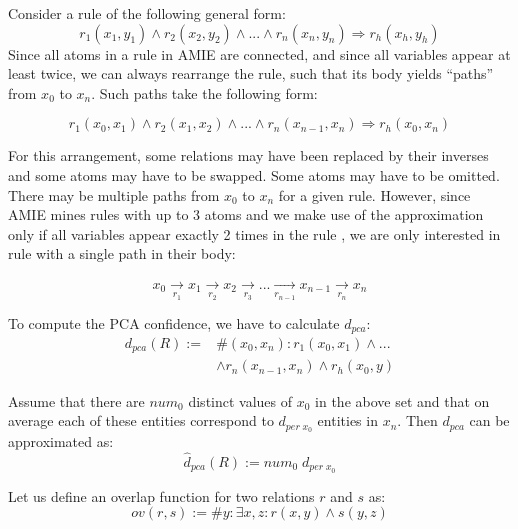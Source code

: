 {{Consider a rule of the following general form:
$$
  r_1(x_1,y_1) \wedge r_2(x_2,y_2) \wedge ... \wedge r_n(x_n,y_n) \Rightarrow r_h(x_h,y_h)
$$
Since all atoms in a rule in AMIE are connected, and since all variables appear at least twice, we can always rearrange the rule, such that its body yields  ``paths'' from $x_0$ to $x_n$. Such paths take the following form:

$$
  r_1(x_0,x_1) \wedge r_2(x_1,x_2) \wedge ... \wedge r_n(x_{n-1},x_n) \Rightarrow r_h(x_0,x_n)
$$


For this arrangement, some relations may have been replaced by their inverses and some atoms may have to be swapped. Some atoms may have to be omitted.
There may be multiple paths from $x_0$ to $x_n$ for a given rule.
However, since AMIE mines rules with up to 3 atoms and we make use of the approximation only if all variables appear exactly 2 times in the rule
,
we are only interested in rule with a single path in their body: 

\[
 x_0 \xrightarrow[r_1]{}x_1 \xrightarrow[r_2]{}     x_2 \xrightarrow[r_3]{}...  \xrightarrow[r_{n-1}]{}  x_{n-1}  \xrightarrow[r_n]{}   x_n
\]

To compute the PCA confidence, we have to calculate $d_{pca}$:
$$
\begin{array}{rl}
d_{pca}(R):=&\#(x_0,x_n): r_1(x_0,x_1) \wedge ...\\& \wedge r_n(x_{n-1},x_n) \wedge r_h(x_0,y)
\end{array}
$$

Assume that there are $num_0$ distinct values of $x_0$ in the above set and that on average each of these entities correspond to $d_{per\; x_0}$ entities in $x_n$.
Then $d_{pca}$ can be approximated as:
\[
  \widehat{d}_{pca}(R) := num_0 \; d_{per\; x_0}
\]

Let us define an overlap function for two relations $r$ and $s$ as:
$$ov(r,s) := \# y: \exists x,z: r(x,y) \wedge s(y,z)$$

}}
